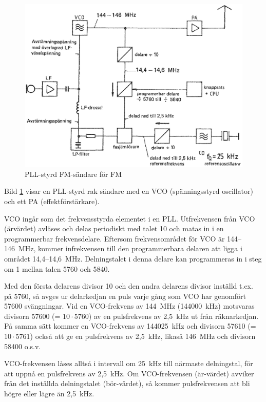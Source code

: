 \begin{figure}
  \includegraphics[width=\textwidth]{images/cropped_pdfs/bild_2_5-07.pdf}
  \caption{PLL-styrd FM-sändare för FM}
  \label{fig:bildII5-7}
\end{figure}

Bild \ref{fig:bildII5-7} visar en PLL-styrd rak sändare med en
VCO (spänningsstyrd oscillator) och ett PA (effektförstärkare).

VCO ingår som det frekvensstyrda elementet i en PLL.
Utfrekvensen från VCO (ärvärdet) avläses och delas periodiskt med talet 10
och matas in i en programmerbar frekvensdelare.
Eftersom frekvensområdet för VCO är 144--146~MHz, kommer infrekvensen till
den programmerbara delaren att ligga i området 14,4--14,6~MHz.
Delningstalet i denna delare kan programmeras in i steg om 1 mellan
talen 5760 och 5840.

Med den första delarens divisor 10 och den andra delarens divisor
inställd t.ex. på 5760, så avges ur delarkedjan en puls varje gång som
VCO har genomfört 57600 svängningar.
Vid en VCO-frekvens av 144~MHz (144000~kHz) motsvaras divisorn
57600 (= \(10 \cdot 5760\)) av en pulsfrekvens av 2,5~kHz ut från räknarkedjan.
På samma sätt kommer en VCO-frekvens av 144025~kHz och divisorn
57610 (= \(10 \cdot 5761\)) också att ge en pulsfrekvens av 2,5~kHz,
likaså 146~MHz och divisorn 58400 o.s.v.

VCO-frekvensen låses alltså i intervall om 25~kHz till närmaste
delningstal, för att uppnå en pulsfrekvens av 2,5~kHz.
Om VCO-frekvensen (är-värdet) avviker från det inställda delningstalet
(bör-värdet), så kommer pulsfrekvensen att bli högre eller lägre än
2,5~kHz.

